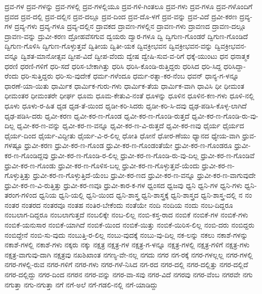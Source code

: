 {ದ್ರವ-ಗಳ
ದ್ರವ-ಗಳನ್ನು
ದ್ರವ-ಗಳಲ್ಲಿ
ದ್ರವ-ಗಳಲ್ಲಿಯೂ
ದ್ರವ-ಗಳಿ-ಗಿಂತಲೂ
ದ್ರವ-ಗಳು
ದ್ರವ-ಗಳೂ
ದ್ರವ-ಗಳೊಂದಿಗೆ
ದ್ರವದ
ದ್ರವ-ದಲ್ಲಿ
ದ್ರವ-ದಲ್ಲಿನ
ದ್ರವ-ದಲ್ಲೂ
ದ್ರವ-ದಿಂದ
ದ್ರವ-ದೊ-ಳಗೆ
ದ್ರವ-ವನ್ನು
ದ್ರವ-ವಿದೆ
ದ್ರವೀ-ಕರಣ
ದ್ರವ್ಯ-ಗಳ
ದ್ರವ್ಯ-ಗಳು
ದ್ರವ್ಯ-ಗಳೂ
ದ್ರವ್ಯ-ದಲ್ಲಿನ
ದ್ರಾವಕದ
ದ್ರಾವಣ-ಗಳಲ್ಲಿನ
ದ್ರಾವಣ-ಗಳು
ದ್ರಾವಣದ
ದ್ರಾವಣ-ದಲ್ಲೂ
ದ್ರಾವಣ-ವನ್ನು
ದ್ರುವೀ-ಕರಣ
ದ್ರೋಹವೆಸಗುವ
ದ್ವಯರು
ದ್ವಾರ-ಗಳೂ
ದ್ವಿ
ದ್ವಿಗುಣ-ಗೊಂಡರೆ
ದ್ವಿಗುಣ-ಗೊಂಡಿದೆ
ದ್ವಿಗುಣ-ಗೊಳಿಸಿ
ದ್ವಿಗುಣ-ಗೊಳ್ಳುತ್ತವೆ
ದ್ವಿತೀಯ
ದ್ವಿತೀ-ಯಕ
ದ್ವಿವಕ್ರೀಭವನ
ದ್ವಿವಕ್ರೀಭವನ-ವನ್ನು
ದ್ವಿವಕ್ರೀಭವನ-ವನ್ನೂ
ದ್ವಿಶತ-ಮಾನೋತ್ಸವ
ದ್ವೀಪ-ವಿದೆ
ದ್ವೀಪ-ವೆಂದು
ದ್ವೇಷ
ದ್ವೇಷಿ-ಸುವ-ವ-ರಿಗೆ
ಧಕ್ಕೆ-ಯುಂಟು
ಧನ
ಧನಾತ್ಮಕ
ಧರಣಿ
ಧರಣಿ-ಗಳಿಗೆ
ಧರಿ-ಸದೆ
ಧರಿಸ-ಬೇಕಾಗಿತ್ತು
ಧರಿಸಿ
ಧರಿಸಿ-ಕೊಂಡಿ-ರುತ್ತಿದ್ದರು
ಧರಿಸಿದ
ಧರಿ-ಸಿದ್ದ
ಧರಿಸಿದ್ದಾ-ರೆಂದು
ಧರಿ-ಸುತ್ತಿದ್ದರು
ಧರಿ-ಸು-ವುದೇಕೆ
ಧರ್ಮ-ಗಳೆಂದೂ
ಧರ್ಮ-ರತ್ನಾ-ಕರ-ನೆಂಬ
ಧವನ್
ಧಾನ್ಯ-ಗ-ಳನ್ನೂ
ಧಾರಣೆ-ಯಾ-ಯಿತು
ಧಾರ್ಮಿಕ
ಧಾರ್ಮಿಕ-ಗುರು-ಗಳು
ಧಾರ್ಮಿಕ-ತೆಯ
ಧಾರ್ಮಿಕ-ವಾಗಿ
ಧಾವಿಸಿ
ಧೀ
ಧೀಮಂತ
ಧೀಮಂತರ
ಧೀಮಂತರೇ
ಧೀರ್ಘ
ಧೂಮ
ಧೂಮ-ಕೇತುವಿ-ನಂತೆ
ಧೂಳನ್ನು
ಧೂಳಿನ
ಧೂಳಿನ-ಕಣ-ಗಳು
ಧೂಳಿ-ನಲ್ಲಿ
ಧೂಳು
ಧೂಳು-ರ-ಹಿತ
ಧೃಡ
ಧೃಡ-ತೆ-ಯಿಂದ
ಧೃಡೀ-ಕರಿ-ಸಿದರು
ಧೃಡೀ-ಕರಿ-ಸಿ-ದವು
ಧೃಢ-ಪಡಿಸಿ-ಕೊಳ್ಳ-ಲಾಗಿದೆ
ಧೃಢ-ಪಡಿಸಿ-ದರು
ಧೃವೀ-ಕರಣ
ಧೃವೀ-ಕರ-ಣ-ಗೊಂಡ
ಧೃವೀ-ಕರ-ಣ-ಗೊಂಡಿ-ರುತ್ತದೆ
ಧೃವೀ-ಕರ-ಣ-ಗೊಂಡಿ-ರು-ವು-ದಿಲ್ಲ
ಧೃವೀ-ಕರ-ಣ-ವನ್ನು
ಧೃವೀ-ಕರ-ಣ-ವನ್ನೂ
ಧೃವೀ-ಕರ-ಣ-ವಿ-ರುತ್ತದೆ
ಧೃವೀ-ಕರ-ಣವು
ಧೈರ್ಯ
ಧೈರ್ಯದ
ಧೈರ್ಯ-ದಿಂದ
ಧೈರ್ಯ-ವಿದ್ದೀತು
ಧೈರ್ಯ-ವಿ-ರ-ಲಿಲ್ಲ
ಧೋತಿ
ಧೋನೆ
ಧೋರ-ಣೆಯು
ಧ್ಯಾನದ
ಧ್ಯೇಯ-ವಾಗಿ
ಧ್ರುವ-ಗಳಷ್ಟೂ
ಧ್ರುವೀ-ಕರಣ
ಧ್ರುವೀ-ಕರ-ಣ-ಗೊಂಡ
ಧ್ರುವೀ-ಕರ-ಣ-ಗೊಂಡಂತೆಯೇ
ಧ್ರುವೀ-ಕರ-ಣ-ಗೊಂಡರೂ
ಧ್ರುವೀ-ಕರ-ಣ-ಗೊಂಡಿದ್ದವು
ಧ್ರುವೀ-ಕರ-ಣ-ಗೊಂಡಿ-ರ-ಲಿಲ್ಲ
ಧ್ರುವೀ-ಕರ-ಣ-ಗೊಂಡಿ-ರು-ವು-ದಿಲ್ಲ
ಧ್ರುವೀ-ಕರ-ಣ-ಗೊಂಡಿವೆ
ಧ್ರುವೀ-ಕರ-ಣ-ಗೊಂಡು
ಧ್ರುವೀ-ಕರ-ಣ-ಗೊಳಿಸ-ಬಲ್ಲ
ಧ್ರುವೀ-ಕರ-ಣ-ಗೊಳ್ಳುತ್ತವೆ-ಯೆಂದು
ಧ್ರುವೀ-ಕರ-ಣ-ಗೊಳ್ಳುತ್ತಿತ್ತು
ಧ್ರುವೀ-ಕರ-ಣ-ಗೊಳ್ಳುತ್ತಿದೆ-ಯೆಂಬ
ಧ್ರುವೀ-ಕರ-ಣದ
ಧ್ರುವೀ-ಕರ-ಣ-ವನ್ನೂ
ಧ್ರುವೀ-ಕರ-ಣ-ವಾಗುವುದೇ
ಧ್ರುವೀ-ಕರ-ಣ-ವಿ-ರುತ್ತಿತ್ತು
ಧ್ರುವೀ-ಕರ-ಣವೂ
ಧ್ರುವೀ-ಕಾರ-ಕ-ಗಳ
ಧ್ವಂಸದ
ಧ್ವಜವು
ಧ್ವನಿ
ಧ್ವನಿ-ಗಳ
ಧ್ವನಿ-ಗಳು
ಧ್ವನಿ-ತರಂಗ-ಗಳಿಂದ
ಧ್ವನಿಯ
ಧ್ವನಿ-ಯಲ್ಲಿ
ಧ್ವನಿ-ಯಿಂದ
ಧ್ವನಿ-ಶಾಸ್ತ್ರ
ಧ್ವನಿ-ಶಾಸ್ತ್ರಕ್ಕೆ
ಧ್ವನಿ-ಶಾಸ್ತ್ರದ
ಧ್ವನಿ-ಶಾಸ್ತ್ರ-ದಲ್ಲಿ
ನ
ನಂ
ನಂತರ
ನಂತರದ
ನಂತರವೂ
ನಂತಹ
ನಂತಿರ-ಬೇಕೆಂದು
ನಂತೆಯೇ
ನಂದಿ
ನಂದಿಯ
ನಂದು
ನಂಬ-ದಿದ್ದರೂ
ನಂಬಲಾಗ-ದಿದ್ದರೂ
ನಂಬಲಾಗುತ್ತದೆ
ನಂಬಲಿಕ್ಕೇ
ನಂಬ-ಲಿಲ್ಲ
ನಂಬಿ-ಕಸ್ತ-ರಾದ
ನಂಬಿಕೆ
ನಂಬಿಕೆ-ಗಳ
ನಂಬಿಕೆ-ಗಳು
ನಂಬಿಕೆ-ಯನುಸಾರ
ನಂಬಿಕೆ-ಯಾಗಿದೆ
ನಂಬಿಕೆ-ಯಿಂದ
ನಂಬಿಕೆ-ಯಿತ್ತು
ನಂಬಿಕೆ-ಯಿರಿಸ-ಲಿಲ್ಲ
ನಂಬಿ-ದರು
ನಂಬಿದ್ದರು
ನಂಬಿದ್ದೇನೆ
ನಂಬಿ-ಸು-ವುದು
ನಂಬುತ್ತಿ-ರ-ಲಿಲ್ಲ
ನಂಬು-ವುದಕ್ಕೆ
ನಂಬು-ವು-ದಿಲ್ಲ
ನಕ-ಲನ್ನು
ನಕಲು
ನಕಾಶೆ-ಗಳನ್ನು
ನಕಾಶೆ-ಗಳಲ್ಲಿ
ನಕಾಶೆ-ಗಳು
ನಕ್ಕರು
ನಕ್ಕು
ನಕ್ಷತ್ರ
ನಕ್ಷತ್ರ-ಗಳ
ನಕ್ಷತ್ರ-ಗ-ಳನ್ನೂ
ನಕ್ಷತ್ರ-ಗಳಲ್ಲಿ
ನಕ್ಷತ್ರ-ಗಳಿಗೆ
ನಕ್ಷತ್ರ-ಗಳು
ನಕ್ಷತ್ರ-ವಾಗುವು-ದಾಗಿ
ನಕ್ಷತ್ರವು
ನಖಶಿಖಾಂತ
ನಗಣ್ಯ-ವೇ-ನಲ್ಲ
ನಗದು
ನಗರ
ನಗ-ರಕ್ಕೆ
ನಗರ-ಗಳಲ್ಲಲ್ಲ
ನಗರ-ಗಳಲ್ಲಿ
ನಗರ-ಗಳಲ್ಲಿ-ರುವ
ನಗರ-ಗಳಿಗೆ
ನಗರ-ಗಳು
ನಗರ-ಗಳೆ-ನಿಸಿದ
ನಗ-ರದ
ನಗರ-ದಲ್ಲಿ
ನಗರ-ದಲ್ಲಿತ್ತು
ನಗರ-ದಲ್ಲಿದೆ
ನಗರ-ದಲ್ಲಿದ್ದು
ನಗರ-ದಿಂದ
ನಗರನ
ನಗರ-ವನ್ನು
ನಗರ-ವಾ-ಸವು
ನಗರ-ವಿದೆ
ನಗರವು
ನಗರ-ವೆಂಬ
ನಗರವೇ
ನಗು
ನಗುತ್ತಾ
ನಗು-ನಗುತ್ತಾ
ನಗೆ
ನಗೆ-ಅಲೆ
ನಗೆ-ಗಡಲಿ-ನಲ್ಲಿ
ನಗೆ-ಯಾಡಿದ್ದು
}
